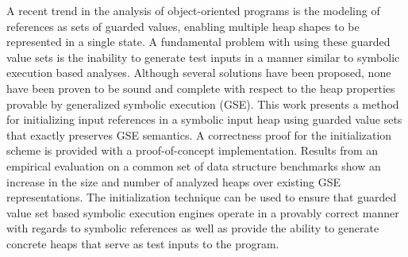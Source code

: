 A recent trend in the analysis of object-oriented programs is the
modeling of references as sets of guarded values, enabling multiple
heap shapes to be represented in a single state.  A fundamental
problem with using these guarded value sets is the inability to
generate test inputs in a manner similar to symbolic execution based
analyses.
Although several solutions have been proposed, none have been proven
to be sound and complete with respect to the heap properties provable
by generalized symbolic execution (GSE). This work presents a method for initializing input references
in a symbolic input heap using guarded value sets that exactly
preserves GSE semantics. A correctness proof for the initialization
scheme is provided with a proof-of-concept implementation. Results from an empirical evaluation on a common set of \gsetxt{} data structure benchmarks show an increase in the
size and number of analyzed heaps over existing GSE
representations. The initialization technique can be used to ensure
that guarded value set based symbolic execution engines operate in a
provably correct manner with regards to symbolic references as well as
provide the ability to generate concrete heaps that serve as test
inputs to the program.



